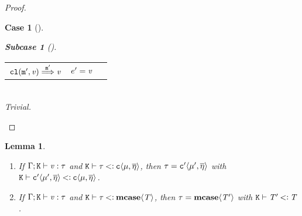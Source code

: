 \documentclass[onecolumn,nocopyrightspace]{sigplanconf}
\newtheorem{lemma}{Lemma}
\theoremstyle{lessintrusive}
\theoremstyle{plain}
\theoremstyle{custom}
\newtheorem*{case}{Case}
\theoremstyle{subcase-custom}
\newtheorem*{subcase}{Subcase}
\begin{document}
\begin{proof}
\begin{case}[]
\begin{subcase}[]
\begin{tabular}[t]{>{$}l<{$} >{$}l<{$} >{$}l<{$}}
\cl{\moname'}{\val} \cloreduct{\moname'} \val & e' = \val & \\
\end{tabular}\\
Trivial.
\end{subcase}

\end{case}



\end{proof}

\begin{lemma}
\label{pf:value-subtype-inversion}
\leavevmode
\begin{enumerate}[(\arabic*)] 

\item If $\Gamma;\mathtt{K}\vdash\mathit{v}:\tau$ and $\mathtt{K}\vdash\tau\mathbin{<\vcentcolon}\mathtt{c}\langle\mu,\overline{\eta}\rangle$, then $\tau = \mathtt{c}'\langle\mu',\overline{\eta}\rangle$ with $\mathtt{K}\vdash\mathtt{c}'\langle\mu',\overline{\eta}\rangle\mathbin{<\vcentcolon}\mathtt{c}\langle\mu,\overline{\eta}\rangle$.

\item If $\Gamma;\mathtt{K}\vdash\mathit{v}:\tau$ and $\mathtt{K}\vdash\tau\mathbin{<\vcentcolon}\texttt{\bf mcase}\langle\mathit{T}\rangle$, then $\tau = \texttt{\bf mcase}\langle\mathit{T}'\rangle$ with $\mathtt{K}\vdash\mathit{T}'\mathbin{<\vcentcolon}\mathit{T}$.

\end{enumerate}

\end{lemma}
\end{document}
